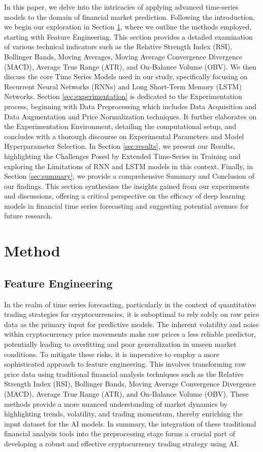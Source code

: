 \documentclass[10pt,twocolumn,letterpaper]{article}
\begin{document}
In this paper, we delve into the intricacies of applying advanced time-series models to the domain of financial market prediction. Following the introduction, we begin our exploration in Section \ref{sec:method}, where we outline the methods employed, starting with Feature Engineering. This section provides a detailed examination of various technical indicators such as the Relative Strength Index (RSI), Bollinger Bands, Moving Averages, Moving Average Convergence Divergence (MACD), Average True Range (ATR), and On-Balance Volume (OBV). We then discuss the core Time Series Models used in our study, specifically focusing on Recurrent Neural Networks (RNNs) and Long Short-Term Memory (LSTM) Networks. Section \ref{sec:experimentation} is dedicated to the Experimentation process, beginning with Data Preprocessing which includes Data Acquisition and Data Augmentation and Price Normalization techniques. It further elaborates on the Experimentation Environment, detailing the computational setup, and concludes with a thorough discourse on Experimental Parameters and Model Hyperparameter Selection. In Section \ref{sec:results}, we present our Results, highlighting the Challenges Posed by Extended Time-Series in Training and exploring the Limitations of RNN and LSTM models in this context. Finally, in Section \ref{sec:summary}, we provide a comprehensive Summary and Conclusion of our findings. This section synthesizes the insights gained from our experiments and discussions, offering a critical perspective on the efficacy of deep learning models in financial time series forecasting and suggesting potential avenues for future research.

\section{Method} \label{sec:method}
\subsection{Feature Engineering}

In the realm of time series forecasting, particularly in the context of quantitative trading strategies for cryptocurrencies, it is suboptimal to rely solely on raw price data as the primary input for predictive models. The inherent volatility and noise within cryptocurrency price movements make raw prices a less reliable predictor, potentially leading to overfitting and poor generalization in unseen market conditions. To mitigate these risks, it is imperative to employ a more sophisticated approach to feature engineering. This involves transforming raw price data using traditional financial analysis techniques such as the Relative Strength Index (RSI), Bollinger Bands, Moving Average Convergence Divergence (MACD), Average True Range (ATR), and On-Balance Volume (OBV). These methods provide a more nuanced understanding of market dynamics by highlighting trends, volatility, and trading momentum, thereby enriching the input dataset for the AI models. In summary, the integration of these traditional financial analysis tools into the preprocessing stage forms a crucial part of developing a robust and effective cryptocurrency trading strategy using AI.
\end{document}
